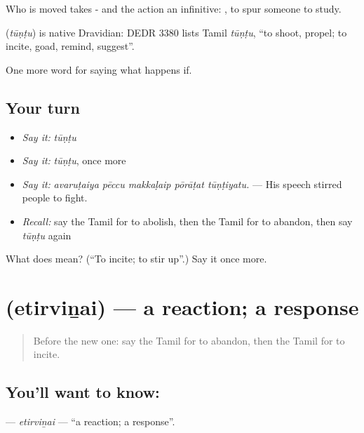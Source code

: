 Who is moved takes - and the action an infinitive:  , to spur someone to study.

\begin{cousinweb}
\textbf{} (\emph{tūṇṭu}) is native Dravidian: DEDR 3380 lists Tamil \emph{tūṇṭu}, \textquotedblleft{}to shoot, propel; to incite, goad, remind, suggest\textquotedblright{}.
\end{cousinweb}

\begin{grammarlens}[title={What you've built}]
One more word for saying what happens if.
\end{grammarlens}

\subsection*{Your turn}
\begin{itemize}
\raggedright
  \item \emph{Say it:} \emph{tūṇṭu}
  \item \emph{Say it:} \emph{tūṇṭu}, once more
  \item \emph{Say it:} \emph{avaruṭaiya pēccu makkaḷaip pōrāṭat tūṇṭiyatu.} — His speech stirred people to fight.
  \item \emph{Recall:} say the Tamil for to abolish, then the Tamil for to abandon, then say \emph{tūṇṭu} again
\end{itemize}

\begin{tcolorbox}[breakable,colback=teal!4,colframe=teal!35!black,title={Before you move on}]
What does  mean? (\textquotedblleft{}To incite; to stir up\textquotedblright{}.) Say it once more.
\end{tcolorbox}
\section[\texorpdfstring{\ta{எதிர்வினை} (etirviṉai)}{எதிர்வினை (etirviṉai)}]{ (etirviṉai) — a reaction; a response}

\label{lesson:TA-C396-etirvinai}



\begin{quote}
Before the new one: say the Tamil for to abandon, then the Tamil for to incite.
\end{quote}

\subsection*{You'll want to know: }
\textbf{} — \emph{etirviṉai} — \textquotedblleft{}a reaction; a response\textquotedblright{}.

